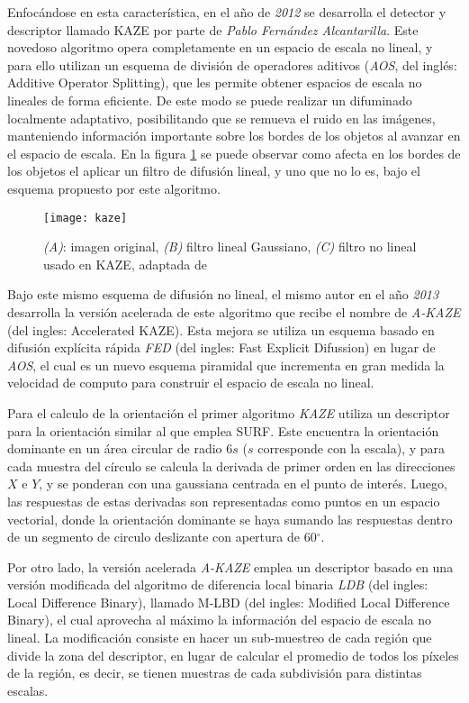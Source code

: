 Enfocándose en esta característica, en el año de \textit{2012} se desarrolla el detector y descriptor llamado KAZE \cite{kaze} por parte de \textit{Pablo Fernández Alcantarilla}. Este novedoso algoritmo opera completamente en un espacio de escala no lineal, y para ello utilizan un esquema de división de operadores aditivos (\textit{AOS}, del inglés: Additive Operator Splitting), que les permite obtener espacios de escala no lineales de forma eficiente. De este modo se puede realizar un difuminado localmente adaptativo, posibilitando que se remueva el ruido en las imágenes, manteniendo información importante sobre los bordes de los objetos al avanzar en el espacio de escala. En la figura \ref{imagen:kaze} se puede observar como afecta en los bordes de los objetos el aplicar un filtro de difusión lineal, y uno que no lo es, bajo el esquema propuesto por este algoritmo.

\begin{figure}[H]
	\centering
	\texttt{[image: kaze]}
	\caption[Filtro no lineal propuesto por KAZE]{\textit{(A)}: imagen original, \textit{(B)} filtro lineal Gaussiano, \textit{(C)} filtro no lineal usado en KAZE, adaptada de \cite{kaze}}
	\label{imagen:kaze}
\end{figure}

Bajo este mismo esquema de difusión no lineal, el mismo autor en el año \textit{2013} desarrolla la versión acelerada de este algoritmo que recibe el nombre de \textit{A-KAZE} \cite{akaze} (del ingles: Accelerated KAZE). Esta mejora se utiliza un esquema basado en difusión explícita rápida \textit{FED} (del ingles: Fast Explicit Difussion) en lugar de \textit{AOS}, el cual es un nuevo esquema piramidal que incrementa en gran medida la velocidad de computo para construir el espacio de escala no lineal.

Para el calculo de la orientación el primer algoritmo \textit{KAZE} utiliza un descriptor para la orientación similar al que emplea SURF. Este encuentra la orientación dominante en un área circular de radio 6$s$ ($s$ corresponde con la escala), y para cada muestra del círculo se calcula la derivada de primer orden en las direcciones $X$ e $Y$, y se ponderan con una gaussiana centrada en el punto de interés. Luego, las respuestas de estas derivadas son representadas como puntos en un espacio vectorial, donde la orientación dominante se haya sumando las respuestas dentro de un segmento de circulo deslizante con apertura de 60$^\circ$.

Por otro lado, la versión acelerada \textit{A-KAZE} emplea un descriptor basado en una versión modificada del algoritmo de diferencia local binaria \textit{LDB} \cite{ldb} (del ingles: Local Difference Binary), llamado M-LBD (del ingles: Modified Local Difference Binary), el cual aprovecha al máximo la información del espacio de escala no lineal. La modificación consiste en hacer un sub-muestreo de cada región que divide la zona del descriptor, en lugar de calcular el promedio de todos los píxeles de la región, es decir, se tienen muestras de cada subdivisión para distintas escalas.


